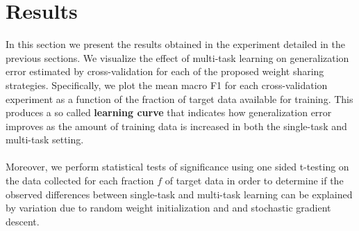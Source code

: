 \chapter{Results}
In this section we present the results obtained in the experiment detailed in the previous sections. We visualize the effect of multi-task learning on generalization error estimated by cross-validation for each of the proposed weight sharing strategies. Specifically, we plot the mean macro F1 for each cross-validation experiment as a function of the fraction of target data available for training. This produces a so called \textbf{learning curve} that indicates how generalization error improves as the amount of training data is increased in both the single-task and multi-task setting.
\\\\
Moreover, we perform statistical tests of significance using one sided t-testing on the data collected for each fraction $f$ of target data in order to determine if the observed differences between single-task and multi-task learning can be explained by variation due to random weight initialization and and stochastic gradient descent.
